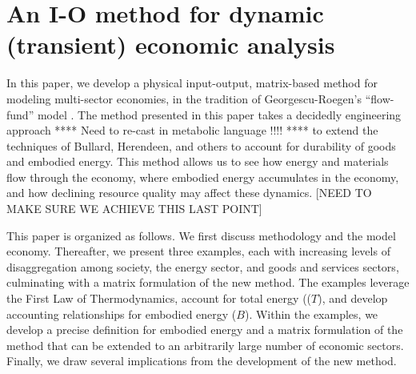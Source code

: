 \section{An I-O method for dynamic (transient) economic analysis}

In this paper, we develop a physical input-output, matrix-based method for modeling multi-sector economies, in the tradition of Georgescu-Roegen's ``flow-fund'' model \cite{G-R1979a, G-R1979b}. The method presented in this paper takes a decidedly engineering approach **** Need to re-cast in metabolic language !!!! **** to extend the techniques of Bullard, Herendeen, and others to account for durability of goods and embodied energy. This method allows us to see how energy and materials flow through the economy, where embodied energy accumulates in the economy, and how declining resource quality may affect these dynamics. [NEED TO MAKE SURE WE ACHIEVE THIS LAST POINT]

This paper is organized as follows. We first discuss methodology and the model economy. Thereafter, we present three examples, each with increasing levels of disaggregation among society, the energy sector, and goods and services sectors, culminating with a matrix formulation of the new method. The examples leverage the First Law of Thermodynamics, account for total energy (($T$), and develop accounting relationships for embodied energy ($B$). Within the examples, we develop a precise definition for embodied energy and a matrix formulation of the method that can be extended to an arbitrarily large number of economic sectors. Finally, we draw several implications from the development of the new method.








%
%

